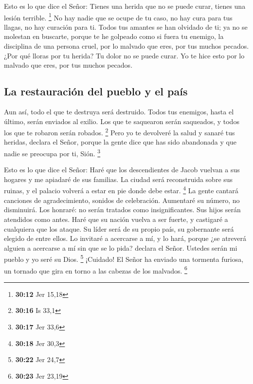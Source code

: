  Esto es lo que dice el Señor: Tienes una herida que no
se puede curar, tienes una lesión terrible. \footnote{\textbf{30:12} Jer
  15,18}  No hay nadie que se ocupe de tu caso, no hay
cura para tus llagas, no hay curación para ti.  Todos tus
amantes se han olvidado de ti; ya no se molestan en buscarte, porque te
he golpeado como si fuera tu enemigo, la disciplina de una persona
cruel, por lo malvado que eres, por tus muchos pecados. 
¿Por qué lloras por tu herida? Tu dolor no se puede curar. Yo te hice
esto por lo malvado que eres, por tus muchos pecados.

\hypertarget{la-restauraciuxf3n-del-pueblo-y-el-pauxeds}{%
\subsection{La restauración del pueblo y el
país}\label{la-restauraciuxf3n-del-pueblo-y-el-pauxeds}}

 Aun así, todo el que te destruya será destruido. Todos
tus enemigos, hasta el último, serán enviados al exilio. Los que te
saquearon serán saqueados, y todos los que te robaron serán robados.
\footnote{\textbf{30:16} Is 33,1}  Pero yo te devolveré
la salud y sanaré tus heridas, declara el Señor, porque la gente dice
que has sido abandonada y que nadie se preocupa por ti, Sión.
\footnote{\textbf{30:17} Jer 33,6}

 Esto es lo que dice el Señor: Haré que los descendientes
de Jacob vuelvan a sus hogares y me apiadaré de sus familias. La ciudad
será reconstruida sobre sus ruinas, y el palacio volverá a estar en pie
donde debe estar. \footnote{\textbf{30:18} Jer 30,3}  La
gente cantará canciones de agradecimiento, sonidos de celebración.
Aumentaré su número, no disminuirá. Los honraré: no serán tratados como
insignificantes.  Sus hijos serán atendidos como antes.
Haré que su nación vuelva a ser fuerte, y castigaré a cualquiera que los
ataque.  Su líder será de su propio país, su gobernante
será elegido de entre ellos. Lo invitaré a acercarse a mí, y lo hará,
porque ¿se atreverá alguien a acercarse a mí sin que se lo pida? declara
el Señor.  Ustedes serán mi pueblo y yo seré su Dios.
\footnote{\textbf{30:22} Jer 24,7}  ¡Cuidado! El Señor ha
enviado una tormenta furiosa, un tornado que gira en torno a las cabezas
de los malvados. \footnote{\textbf{30:23} Jer 23,19}

